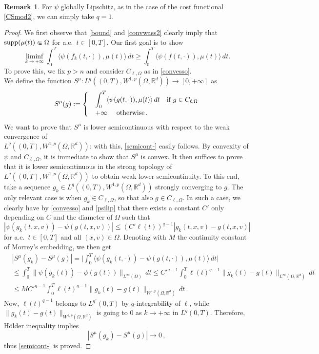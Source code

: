 \documentclass[11pt]{article}
\theoremstyle{plain}
\theoremstyle{definition}
\newtheorem{remark}[theorem]{Remark}
\theoremstyle{remark}
\numberwithin{equation}{section}
\newcommand{\supp}{{\rm supp}}
\newcommand{\R}{{\mathbb R}}
\newcommand{\Om}{\Omega}
\begin{document}
\begin{remark}
For $\psi$ globally Lipschitz, as in the case of the cost functional \eqref{CSmod2}, we can simply take $q=1$.
\end{remark}


\begin{proof}
We first observe that \eqref{bound} and \eqref{convwass2} clearly imply that $\supp (\mu(t)) \Subset  \Omega$ for a.e.\ $t \in [0,T]$.
Our first goal is to show
\begin{equation}\label{semicont-}
\liminf_{k\to +\infty}\int_0^T \langle \psi(f_k(t,\cdot)), \mu(t) \rangle\,dt \ge \int_0^T \langle \psi(f(t,\cdot)), \mu(t) \rangle\,dt. 
\end{equation}
To prove this, we fix $p>n$ and consider $C_{\ell,\Om}$ as in \eqref{convesso}. \\We define the function $S^\mu \colon L^q((0,T), W^{1,p}(\Om, \R^d)) \to [0, +\infty]$ as
\begin{equation*}
S^\mu(g):=\begin{cases}
           &\displaystyle
           \int_0^T \langle \psi(g(t,\cdot)), \mu(t) \rangle\,dt\quad\hbox{if }g\in C_{\ell, \Om}\\
           &\displaystyle
           +\infty\quad\hbox{ otherwise}\,.
          \end{cases}
\end{equation*}
We want to prove that $S^\mu$ is lower semicontinuous with respect to the weak convergence of\\ $L^q((0,T), W^{1,p}(\Om, \R^d))$: with this, \eqref{semicont-} easily follows.
By convexity of $\psi$ and $C_{\ell, \Om}$, it is immediate to show that $S^\mu$ is convex. It then suffices to prove that it is lower semicontinuous in the strong topology of $L^q((0,T), W^{1,p}(\Om, \R^d))$ to obtain weak lower semicontinuity. To this end, take a sequence $g_k \in L^q((0,T), W^{1,p}(\Om, \R^d))$ strongly converging to $g$. The only relevant case is when $g_k \in C_{\ell, \Om}$, so that also $g \in C_{\ell, \Om}$. In such a case, we clearly have by \eqref{convesso} and \eqref{psilip} that there exists a constant $C'$ only depending on $C$ and the diameter of $\Om$ such that
$$
|\psi(g_k(t,x,v))-\psi(g(t,x,v))|\le (C'\ell(t))^{q-1} |g_k(t,x,v)-g(t,x,v)|
$$
for a.e.\ $t\in [0,T]$ and all $(x,v)\in \Om$. Denoting with $M$ the continuity constant of Morrey's embedding, we then get
\begin{eqnarray*}
&\displaystyle
|S^\mu(g_k)-S^\mu(g)|=\Big|\int_0^T \langle \psi(g_k(t,\cdot))-\psi(g(t,\cdot)), \mu(t) \rangle\,dt\Big|\\
&\displaystyle
\le \int_0^T \|\psi(g_k(t))-\psi(g(t))\|_{L^\infty(\Om)}\,dt \le C'^{q-1}\int_0^T \ell(t)^{q-1}\|g_k(t)-g(t)\|_{L^\infty(\Om,\R^d)}\,dt\\
&\displaystyle
\le MC'^{q-1}\int_0^T  \ell(t)^{q-1} \|g_k(t)-g(t)\|_{W^{1,p}(\Om,\R^d)}\,dt\,.
\end{eqnarray*}
Now, $\ell(t)^{q-1}$ belongs to $L^{q'}(0,T)$ by $q$-integrability of $\ell$, while $\|g_k(t)-g(t)\|_{W^{1,p}(\Om,\R^d)}$ is going to $0$ as $k\to +\infty$ in $L^q(0,T)$. Therefore, H\"older inequality implies
$$
|S^\mu(g_k)-S^\mu(g)|\to 0\,,
$$
thus \eqref{semicont-} is proved.


\end{proof}
\end{document}
